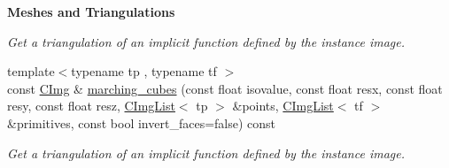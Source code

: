 \begin{Indent}{\bf Meshes and Triangulations}
\begin{DoxyCompactItemize}
\begin{DoxyCompactList}\small\item\em Get a triangulation of an implicit function defined by the instance image. \item\end{DoxyCompactList}\item 
{\footnotesize template$<$typename tp , typename tf $>$ }\\const \hyperlink{structcimg__library_1_1_c_img}{CImg} \& \hyperlink{structcimg__library_1_1_c_img_a4cd7c02509da1cca924a94a9164010ec}{marching\_\-cubes} (const float isovalue, const float resx, const float resy, const float resz, \hyperlink{structcimg__library_1_1_c_img_list}{CImgList}$<$ tp $>$ \&points, \hyperlink{structcimg__library_1_1_c_img_list}{CImgList}$<$ tf $>$ \&primitives, const bool invert\_\-faces=false) const 
\begin{DoxyCompactList}\small\item\em Get a triangulation of an implicit function defined by the instance image. \item\end{DoxyCompactList}\end{DoxyCompactItemize}
\end{Indent}
